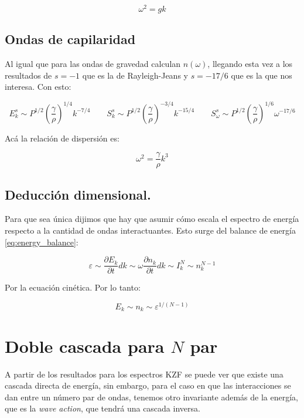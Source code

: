 \begin{equation}
	\omega^2=gk
\end{equation}

\subsection*{Ondas de capilaridad \cite{zakharovWeakTurbulenceCapillary1971}}
Al igual que para las ondas de gravedad calculan $n(\omega)$, llegando esta vez a los resultados de $s=-1$ que es la de Rayleigh-Jeans y $s=-17/6$ que es la que nos interesa. Con esto:

\begin{equation}
	E_k^s \sim P^{1/2} \left(\frac{\gamma}{\rho}\right)^{1/4} k^{-7/4} \qquad S_k^s \sim P^{1/2} \left(\frac{\gamma}{\rho}\right)^{-3/4} k^{-15/4} \qquad S_\omega^s  \sim P^{1/2} \left(\frac{\gamma}{\rho}\right)^{1/6} \omega^{-17/6}
\end{equation}   

Acá la relación de dispersión es:

\begin{equation}
	\omega^2 = \frac{\gamma}{\rho}k^3
\end{equation}


\subsection*{Deducción dimensional.}
Para que sea única dijimos que hay que asumir cómo escala el espectro de energía respecto a la cantidad de ondas interactuantes. Esto surge del balance de energía \eqref{eq:energy_balance}:

\begin{equation}
	\varepsilon \sim \frac{\partial E_k}{\partial t} dk \sim \omega \frac{\partial n_k}{\partial t} dk \sim I_k^N \sim n_k^{N-1}
\end{equation}

Por la ecuación cinética. Por lo tanto: \cite{deikeEtudesExperimentalesNumeriques2013}

\begin{equation}
	E_k \sim n_k \sim \varepsilon^{1/(N-1)}
\end{equation}



\section{Doble cascada para $N$ par} %
A partir de los resultados para los espectros KZF se puede ver que existe una cascada directa de energía, sin embargo, para el caso en que las interacciones se dan entre un número par de ondas, tenemos otro invariante además de la energía, que es la \textit{wave action}, que tendrá una cascada inversa. \cite{nazarenkoWaveTurbulence2011}

